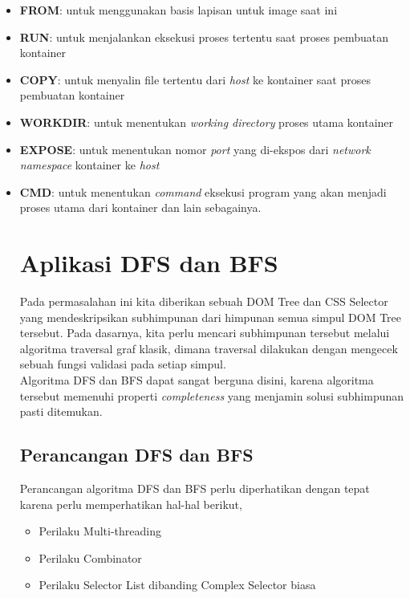 \documentclass[12pt,a4paper]{article}
\begin{document}
\begin{itemize}
    \item \textbf{FROM}: untuk menggunakan basis lapisan untuk image saat ini
    \item \textbf{RUN}: untuk menjalankan eksekusi proses tertentu saat proses pembuatan kontainer
    \item \textbf{COPY}: untuk menyalin file tertentu dari \textit{host} ke kontainer saat proses pembuatan kontainer
    \item \textbf{WORKDIR}: untuk menentukan \textit{working directory} proses utama kontainer
    \item \textbf{EXPOSE}: untuk menentukan nomor \textit{port} yang di-ekspos dari \textit{network namespace} kontainer ke \textit{host} 
    \item \textbf{CMD}: untuk menentukan \textit{command} eksekusi program yang akan menjadi proses utama dari kontainer
dan lain sebagainya. \\

\pagebreak



\section{Aplikasi DFS dan BFS}

Pada permasalahan ini kita diberikan sebuah DOM Tree dan CSS Selector yang mendeskripsikan subhimpunan dari himpunan semua simpul DOM Tree tersebut.
Pada dasarnya, kita perlu mencari subhimpunan tersebut melalui algoritma traversal graf klasik, dimana traversal dilakukan dengan mengecek sebuah fungsi validasi pada setiap simpul. \\

Algoritma DFS dan BFS dapat sangat berguna disini, karena algoritma tersebut memenuhi properti \textit{completeness} yang menjamin solusi subhimpunan pasti ditemukan.


\subsection{Perancangan DFS dan BFS}
Perancangan algoritma DFS dan BFS perlu diperhatikan dengan tepat karena perlu memperhatikan hal-hal berikut,
\begin{itemize}
    \item Perilaku Multi-threading
    \item Perilaku Combinator
    \item Perilaku Selector List dibanding Complex Selector biasa
\end{itemize} \\



\end{itemize}
\end{document}
